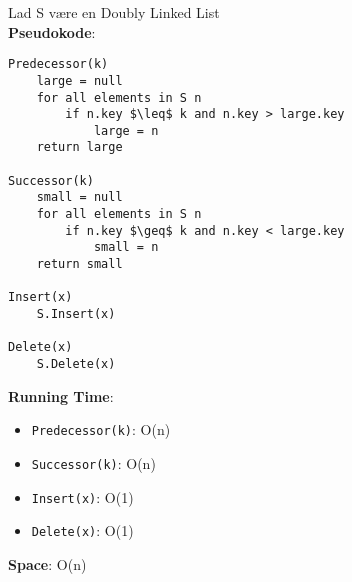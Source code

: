 Lad S være en Doubly Linked List\\
\textbf{Pseudokode}:
\begin{lstlisting}[frame=single, mathescape=true]
Predecessor(k)
	large = null
	for all elements in S n
		if n.key $\leq$ k and n.key > large.key
			large = n
	return large

Successor(k)
	small = null
	for all elements in S n
		if n.key $\geq$ k and n.key < large.key
			small = n
	return small

Insert(x)
	S.Insert(x)

Delete(x)
	S.Delete(x)
\end{lstlisting}
\textbf{Running Time}:
\begin{itemize}
	\item \texttt{Predecessor(k)}: O(n)
	\item \texttt{Successor(k)}: O(n)
	\item \texttt{Insert(x)}: O(1)
	\item \texttt{Delete(x)}: O(1)
\end{itemize}
\textbf{Space}: O(n)